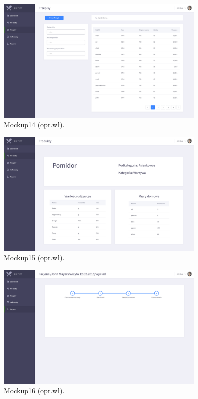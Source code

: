 \begin{minipage}{\textwidth}
    \begin{figure}[H]
        \centering\includegraphics[width=0.9\textwidth]{img/mockups/mockup14.png}
        \caption{Mockup14 (opr.wł).}\label{rysunek:mockup14}
    \end{figure}
\end{minipage}

\begin{minipage}{\textwidth}
    \begin{figure}[H]
        \centering\includegraphics[width=0.9\textwidth]{img/mockups/mockup15.png}
        \caption{Mockup15 (opr.wł).}\label{rysunek:mockup15}
    \end{figure}
\end{minipage}

\begin{minipage}{\textwidth}
    \begin{figure}[H]
        \centering\includegraphics[width=0.9\textwidth]{img/mockups/mockup16.png}
        \caption{Mockup16 (opr.wł).}\label{rysunek:mockup16}
    \end{figure}
\end{minipage}

